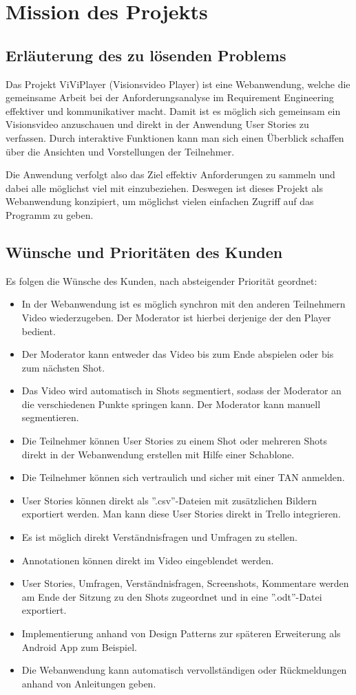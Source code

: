 \section{Mission des Projekts}

\subsection{Erläuterung des zu lösenden Problems}
Das Projekt ViViPlayer (Visionsvideo Player) ist eine Webanwendung, welche die gemeinsame Arbeit 
bei der Anforderungsanalyse im Requirement Engineering effektiver und kommunikativer macht.
Damit ist es möglich sich gemeinsam ein Visionsvideo anzuschauen und direkt in der Anwendung User Stories
zu verfassen. Durch interaktive Funktionen kann man sich einen Überblick schaffen über die Ansichten und Vorstellungen der Teilnehmer.

Die Anwendung verfolgt also das Ziel effektiv Anforderungen zu sammeln und dabei alle möglichst viel mit einzubeziehen.
Deswegen ist dieses Projekt als Webanwendung konzipiert, um möglichst vielen einfachen Zugriff auf das Programm zu geben.

\subsection{Wünsche und Prioritäten des Kunden}
	Es folgen die Wünsche des Kunden, nach absteigender Priorität geordnet:
	\begin{itemize}
		\item In der Webanwendung ist es möglich synchron mit den anderen Teilnehmern Video wiederzugeben. Der Moderator ist hierbei derjenige der den Player bedient.
		\item Der Moderator kann entweder das Video bis zum Ende abspielen oder bis zum nächsten Shot.
		\item Das Video wird automatisch in Shots segmentiert, sodass der Moderator an die verschiedenen Punkte springen kann. Der Moderator kann manuell segmentieren.
		\item Die Teilnehmer können User Stories zu einem Shot oder mehreren Shots direkt in der Webanwendung erstellen mit Hilfe einer Schablone.
		\item Die Teilnehmer können sich vertraulich und sicher mit einer TAN anmelden.
		\item User Stories können direkt als ''.csv''-Dateien mit zusätzlichen Bildern exportiert werden. Man kann diese User Stories direkt in Trello integrieren.
		\item Es ist möglich direkt Verständnisfragen und Umfragen zu stellen.
		\item Annotationen können direkt im Video eingeblendet werden.
		\item User Stories, Umfragen, Verständnisfragen, Screenshots, Kommentare werden am Ende der Sitzung zu den Shots zugeordnet und in eine ''.odt''-Datei exportiert.
		\item Implementierung anhand von Design Patterns zur späteren Erweiterung als Android App zum Beispiel.
		\item Die Webanwendung kann automatisch vervollständigen oder Rückmeldungen anhand von Anleitungen geben.
	\end{itemize}

